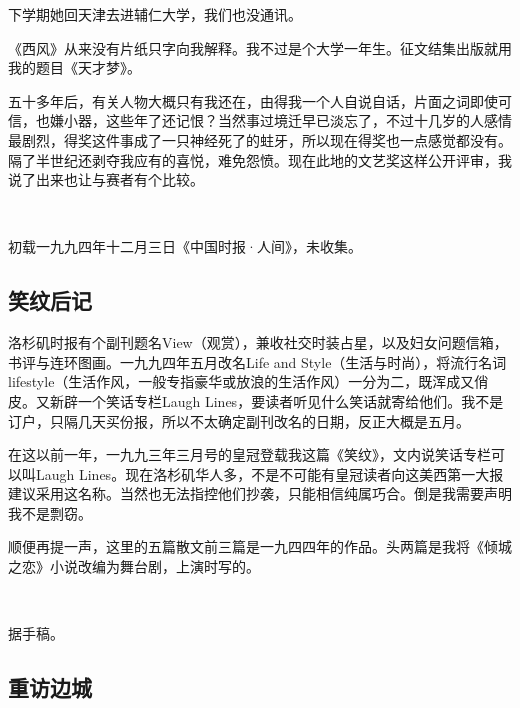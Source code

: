 \par 下学期她回天津去进辅仁大学，我们也没通讯。
\par 《西风》从来没有片纸只字向我解释。我不过是个大学一年生。征文结集出版就用我的题目《天才梦》。
\par 五十多年后，有关人物大概只有我还在，由得我一个人自说自话，片面之词即使可信，也嫌小器，这些年了还记恨？当然事过境迁早已淡忘了，不过十几岁的人感情最剧烈，得奖这件事成了一只神经死了的蛀牙，所以现在得奖也一点感觉都没有。隔了半世纪还剥夺我应有的喜悦，难免怨愤。现在此地的文艺奖这样公开评审，我说了出来也让与赛者有个比较。
\par  
\par *初载一九九四年十二月三日《中国时报·人间》，未收集。




\subsection{笑纹后记}

\par 洛杉矶时报有个副刊题名View（观赏），兼收社交时装占星，以及妇女问题信箱，书评与连环图画。一九九四年五月改名Life and Style（生活与时尚），将流行名词lifestyle（生活作风，一般专指豪华或放浪的生活作风）一分为二，既浑成又俏皮。又新辟一个笑话专栏Laugh Lines，要读者听见什么笑话就寄给他们。我不是订户，只隔几天买份报，所以不太确定副刊改名的日期，反正大概是五月。
\par 在这以前一年，一九九三年三月号的皇冠登载我这篇《笑纹》，文内说笑话专栏可以叫Laugh Lines。现在洛杉矶华人多，不是不可能有皇冠读者向这美西第一大报建议采用这名称。当然也无法指控他们抄袭，只能相信纯属巧合。倒是我需要声明我不是剽窃。
\par 顺便再提一声，这里的五篇散文前三篇是一九四四年的作品。头两篇是我将《倾城之恋》小说改编为舞台剧，上演时写的。
\par  
\par *据手稿。




\subsection{重访边城}


